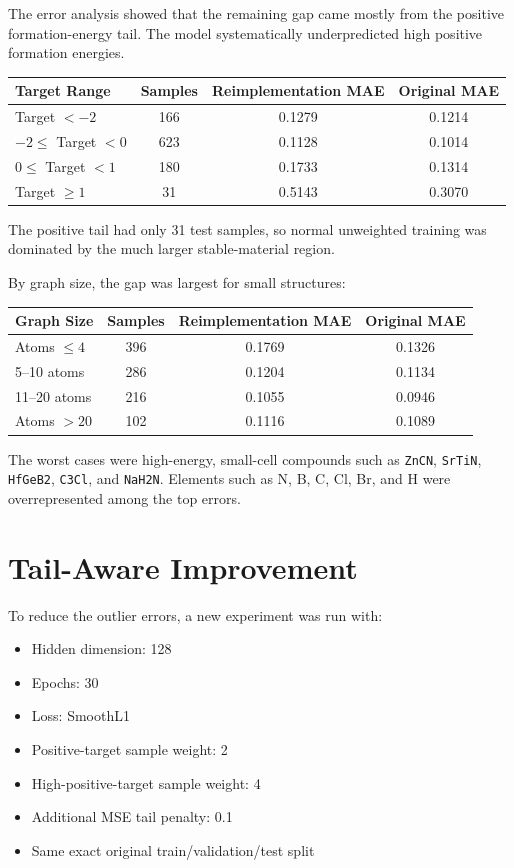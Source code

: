\documentclass[11pt,a4paper]{article}
\begin{document}
The error analysis showed that the remaining gap came mostly from the positive formation-energy tail. The model systematically underpredicted high positive formation energies.

\begin{center}
\begin{tabular}{lccc}
\toprule
Target Range & Samples & Reimplementation MAE & Original MAE \\
\midrule
Target $< -2$ & 166 & 0.1279 & 0.1214 \\
$-2 \leq$ Target $< 0$ & 623 & 0.1128 & 0.1014 \\
$0 \leq$ Target $< 1$ & 180 & 0.1733 & 0.1314 \\
Target $\geq 1$ & 31 & 0.5143 & 0.3070 \\
\bottomrule
\end{tabular}
\end{center}

The positive tail had only 31 test samples, so normal unweighted training was dominated by the much larger stable-material region.

By graph size, the gap was largest for small structures:

\begin{center}
\begin{tabular}{lccc}
\toprule
Graph Size & Samples & Reimplementation MAE & Original MAE \\
\midrule
Atoms $\leq 4$ & 396 & 0.1769 & 0.1326 \\
5--10 atoms & 286 & 0.1204 & 0.1134 \\
11--20 atoms & 216 & 0.1055 & 0.0946 \\
Atoms $> 20$ & 102 & 0.1116 & 0.1089 \\
\bottomrule
\end{tabular}
\end{center}

The worst cases were high-energy, small-cell compounds such as \texttt{ZnCN}, \texttt{SrTiN}, \texttt{HfGeB2}, \texttt{C3Cl}, and \texttt{NaH2N}. Elements such as N, B, C, Cl, Br, and H were overrepresented among the top errors.

\section{Tail-Aware Improvement}

To reduce the outlier errors, a new experiment was run with:

\begin{itemize}
  \item Hidden dimension: 128
  \item Epochs: 30
  \item Loss: SmoothL1
  \item Positive-target sample weight: 2
  \item High-positive-target sample weight: 4
  \item Additional MSE tail penalty: 0.1
  \item Same exact original train/validation/test split
\end{itemize}
\end{document}
